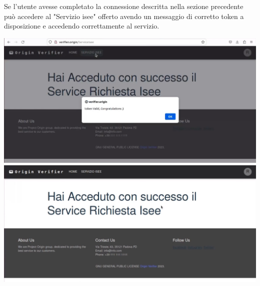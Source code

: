 Se l'utente avesse completato la  connessione descritta nella sezione precedente può accedere al "Servizio isee" offerto avendo un messaggio di corretto token a disposizione e accedendo correttamente al servizio.\\

\begin{center}
\includegraphics[scale = 0.2]{./res/img/verifier/new/tokenvalido.png}
\includegraphics[scale = 0.2]{./res/img/verifier/accessoservizio.png}
\end{center}
